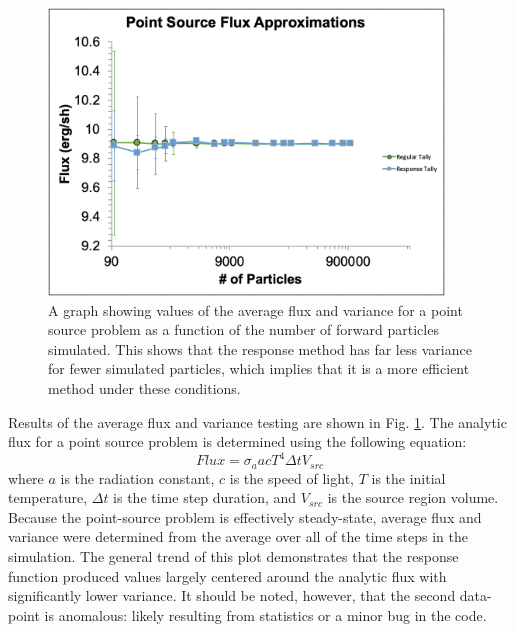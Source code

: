 \documentclass[]{article}
\begin{document}
	\begin{figure} [h!]
		\centering
		\includegraphics[height=3in]{Figures/point_src_errors.png}
		\caption{A graph showing values of the average flux and variance for a point source problem as a function of the number of forward particles simulated. This shows that the response method has far less variance for fewer simulated particles, which implies that it is a more efficient method under these conditions.}
		\label{fig:point_source_errors}
	\end{figure}
	
	Results of the average flux and variance testing are shown in Fig. \ref{fig:point_source_errors}. The analytic flux for a point source problem is determined using the following equation:
	\begin{equation}
		Flux = \sigma_{a}  a  c T^{4} \Delta t V_{src}
	\end{equation}
	where $a$ is the radiation constant, $c$ is the speed of light, $T$ is the initial temperature, $\Delta t$ is the time step duration, and $V_{src}$ is the source region volume. Because the point-source problem is effectively steady-state, average flux and variance were determined from the average over all of the time steps in the simulation. The general trend of this plot demonstrates that the response function produced values largely centered around the analytic flux with significantly lower variance. It should be noted, however, that the second data-point is anomalous: likely resulting from statistics or a minor bug in the code. 
\end{document}
